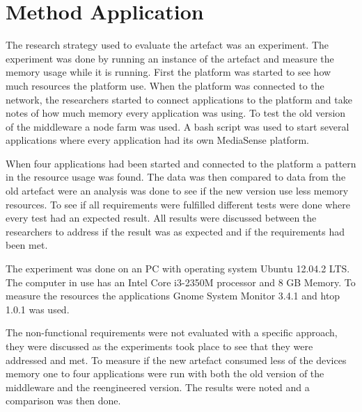 \section{Method Application}
The research strategy used to evaluate the artefact was an experiment. The experiment was done by running an instance of the artefact and measure the memory usage while it is running. First the platform was started to see how much resources the platform use. When the platform was connected to the network, the researchers started to connect applications to the platform and take notes of how much memory every application was using. To test the old version of the middleware a node farm was used. A bash script was used to start several applications where every application had its own MediaSense platform. 

When four applications had been started and connected to the platform a pattern in the resource usage was found. The data was then compared to data from the old artefact were an analysis was done to see if the new version use less memory resources. To see if all requirements were fulfilled different tests were done where every test had an expected result. All results were discussed between the researchers to address if the result was as expected and if the requirements had been met. 

The experiment was done on an PC with operating system Ubuntu 12.04.2 LTS. The computer in use has an Intel Core i3-2350M processor and 8 GB Memory. To measure the resources the applications Gnome System Monitor 3.4.1 \cite{gnomesm} and htop 1.0.1 \cite{htop} was used.

The non-functional requirements were not evaluated with a specific approach, they were discussed as the experiments took place to see that they were addressed and met. To measure if the new artefact consumed less of the devices memory one to four applications were run with both the old version of the middleware and the reengineered version. The results were noted and a comparison was then done. 
